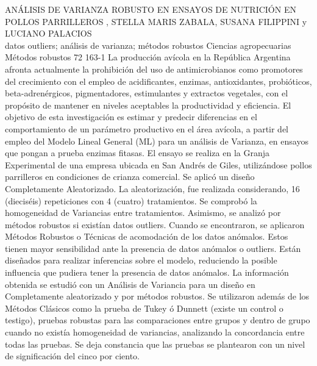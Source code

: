 \A
{ANÁLISIS DE VARIANZA ROBUSTO EN ENSAYOS DE NUTRICIÓN EN POLLOS PARRILLEROS}
{, STELLA MARIS ZABALA, SUSANA FILIPPINI y LUCIANO PALACIOS}
{
\\}
{datos outliers; análisis de varianza; métodos robustos} 
 {Ciencias agropecuarias} 
 {Métodos robustos} 
 {72} 
 {163-1}
{La producción avícola en la República Argentina afronta actualmente la prohibición del uso de antimicrobianos como promotores del crecimiento con el empleo de acidificantes, enzimas, antioxidantes, probióticos, beta-adrenérgicos, pigmentadores, estimulantes y extractos vegetales, con el propósito de mantener en niveles aceptables la productividad y eficiencia. El objetivo de esta investigación es estimar y predecir diferencias en el comportamiento de un parámetro productivo en el área avícola, a partir del empleo del Modelo Lineal General (ML) para un análisis de Varianza, en ensayos que pongan a prueba enzimas fitasas. El ensayo se realiza en la Granja Experimental de una empresa ubicada en San Andrés de Giles, utilizándose pollos parrilleros en condiciones de crianza comercial. Se aplicó un diseño Completamente Aleatorizado. La aleatorización, fue realizada considerando, 16 (dieciséis) repeticiones con 4 (cuatro) tratamientos. Se comprobó la homogeneidad de Variancias entre tratamientos. Asimismo, se analizó por métodos robustos si existían datos outliers. Cuando se encontraron, se aplicaron Métodos Robustos o Técnicas de acomodación de los datos anómalos. Estos tienen mayor sensibilidad ante la presencia de datos anómalos o outliers. Están diseñados para realizar inferencias sobre el modelo, reduciendo la posible influencia que pudiera tener la presencia de datos anómalos. La información obtenida se estudió con un Análisis de Variancia para un diseño en Completamente aleatorizado y por métodos robustos. Se utilizaron además de los Métodos Clásicos como la prueba de Tukey ó Dunnett (existe un control o testigo), pruebas robustas para las comparaciones entre grupos y dentro de grupo cuando no existía homogeneidad de variancias, analizando la concordancia entre todas las pruebas. Se deja constancia que las pruebas se plantearon con un nivel de significación del cinco por ciento. }
